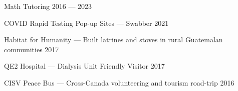 Math Tutoring \hfill 2016 --- 2023

COVID Rapid Testing Pop-up Sites --- Swabber \hfill 2021

Habitat for Humanity --- Built latrines and stoves in rural Guatemalan communities	\hfill 2017

QE2 Hospital --- Dialysis Unit Friendly Visitor	\hfill 2017

CISV Peace Bus --- Cross-Canada volunteering and tourism road-trip	\hfill 2016
